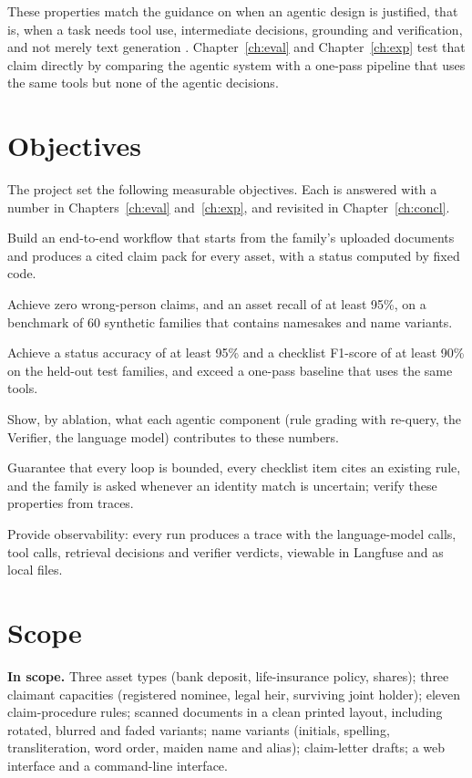 \documentclass[12pt,a4paper,oneside]{report}
\begin{document}
These properties match the guidance on when an agentic design is justified, that is, when a task needs tool use, intermediate decisions, grounding and verification, and not merely text generation \cite{anthropic2024agents,yao2023react}. Chapter~\ref{ch:eval} and Chapter~\ref{ch:exp} test that claim directly by comparing the agentic system with a one-pass pipeline that uses the same tools but none of the agentic decisions.

\section{Objectives}
The project set the following measurable objectives. Each is answered with a number in Chapters~\ref{ch:eval} and~\ref{ch:exp}, and revisited in Chapter~\ref{ch:concl}.

\begin{description}[leftmargin=1.4cm,labelwidth=1.1cm,itemsep=2pt]
\item[O1] Build an end-to-end workflow that starts from the family's uploaded documents and produces a cited claim pack for every asset, with a status computed by fixed code.
\item[O2] Achieve zero wrong-person claims, and an asset recall of at least 95\%, on a benchmark of 60 synthetic families that contains namesakes and name variants.
\item[O3] Achieve a status accuracy of at least 95\% and a checklist F1-score of at least 90\% on the held-out test families, and exceed a one-pass baseline that uses the same tools.
\item[O4] Show, by ablation, what each agentic component (rule grading with re-query, the Verifier, the language model) contributes to these numbers.
\item[O5] Guarantee that every loop is bounded, every checklist item cites an existing rule, and the family is asked whenever an identity match is uncertain; verify these properties from traces.
\item[O6] Provide observability: every run produces a trace with the language-model calls, tool calls, retrieval decisions and verifier verdicts, viewable in Langfuse and as local files.
\end{description}

\section{Scope}
\textbf{In scope.} Three asset types (bank deposit, life-insurance policy, shares); three claimant capacities (registered nominee, legal heir, surviving joint holder); eleven claim-procedure rules; scanned documents in a clean printed layout, including rotated, blurred and faded variants; name variants (initials, spelling, transliteration, word order, maiden name and alias); claim-letter drafts; a web interface and a command-line interface.
\end{document}
